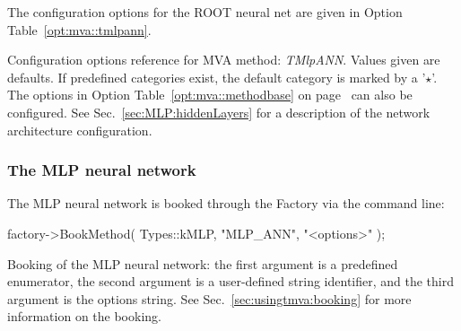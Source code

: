 The configuration options for the ROOT neural net are given in Option Table~\ref{opt:mva::tmlpann}.
\begin{option}[t]

\caption[.]{\optionCaptionSize
     Configuration options reference for MVA method: {\em TMlpANN}.
     Values given are defaults. If predefined categories exist, the default category
     is marked by a '$\star$'. The options in Option Table~\ref{opt:mva::methodbase} on
     page~\pageref{opt:mva::methodbase} can also be configured.
     See Sec.~\ref{sec:MLP:hiddenLayers} for a description of the
     network architecture configuration.
}
\label{opt:mva::tmlpann}
\end{option}

\subsubsection*{The MLP neural network }

The MLP neural network is booked through the Factory via the command line:
\begin{codeexample}
\begin{tmvacode}
factory->BookMethod( Types::kMLP, "MLP_ANN", "<options>" );
\end{tmvacode}
\caption[.]{\codeexampleCaptionSize Booking of the MLP neural network: the first argument
            is a predefined enumerator, the second argument is a user-defined string
            identifier, and the third argument is the options string.
            See Sec.~\ref{sec:usingtmva:booking} for more information on the booking.}
\end{codeexample}


